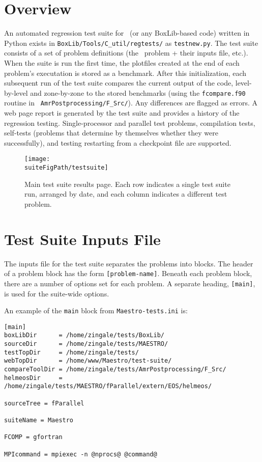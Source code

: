 \section{Overview}

An automated regression test suite for \maestro\ (or any BoxLib-based
code) written in Python exists in {\tt BoxLib/Tools/C\_util/regtests/}
as {\tt testnew.py}.  The test suite consists of a set of problem
definitions (the \maestro\ problem + their inputs file, etc.).  When
the suite is run the first time, the plotfiles created at the end of
each problem's executation is stored as a benchmark.  After this
initialization, each subsequent run of the test suite compares the
current output of the code, level-by-level and zone-by-zone to the
stored benchmarks (using the {\tt fcompare.f90} routine in {\tt
  AmrPostprocessing/F\_Src/}).  Any differences are flagged as errors.
A web page report is generated by the test suite and provides a
history of the regression testing.  Single-processor and parallel test
problems, compilation tests, self-tests (problems that determine by
themselves whether they were successfully), and testing restarting
from a checkpoint file are supported.

\begin{figure}[t]
\centering
\texttt{[image: \\suiteFigPath/testsuite]}
\caption{\label{fig:test_suite_main} Main test suite results page.  Each 
row indicates a single test suite run, arranged by date, and each column
indicates a different test problem. }
\end{figure}

\section{Test Suite Inputs File}

The inputs file for the test suite separates the problems into blocks.
The header of a problem block has the form {\tt [problem-name]}.
Beneath each problem block, there are a number of options set for each
problem.  A separate heading, {\tt [main]}, is used for the suite-wide
options.

An example of the {\tt main} block from {\tt Maestro-tests.ini} is:
\begin{lstlisting}
[main]
boxLibDir      = /home/zingale/tests/BoxLib/
sourceDir      = /home/zingale/tests/MAESTRO/
testTopDir     = /home/zingale/tests/
webTopDir      = /home/www/Maestro/test-suite/
compareToolDir = /home/zingale/tests/AmrPostprocessing/F_Src/
helmeosDir     = /home/zingale/tests/MAESTRO/fParallel/extern/EOS/helmeos/

sourceTree = fParallel

suiteName = Maestro

FCOMP = gfortran

MPIcommand = mpiexec -n @nprocs@ @command@
\end{lstlisting}


